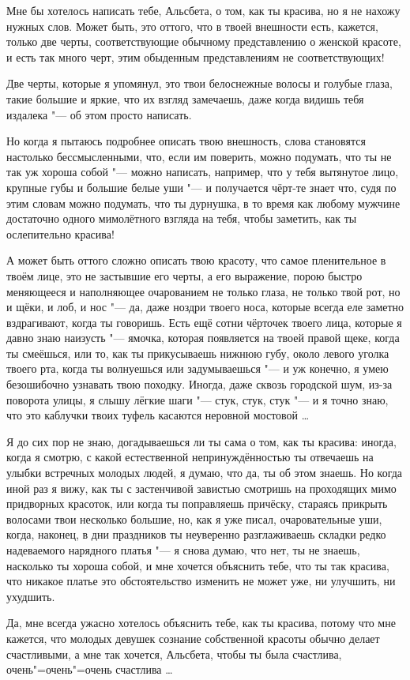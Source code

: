 Мне бы хотелось написать тебе, Альсбета, о том, как ты красива, но я не нахожу
нужных слов.
Может быть, это оттого, что в твоей внешности есть, кажется, только две черты,
соответствующие обычному представлению о женской красоте, и есть так много черт,
этим обыденным представлениям не соответствующих!

Две черты, которые я упомянул, это твои белоснежные волосы и голубые глаза,
такие большие и яркие, что их взгляд замечаешь, даже когда видишь тебя издалека
"--- об этом просто написать.

Но когда я пытаюсь подробнее описать твою внешность, слова становятся настолько
бессмысленными, что, если им поверить, можно подумать, что ты не так уж хороша
собой "--- можно написать, например, что у тебя вытянутое лицо, крупные губы и
большие белые уши "--- и получается чёрт-те знает что, судя по этим словам можно
подумать, что ты дурнушка, в то время как любому мужчине достаточно одного
мимолётного взгляда на тебя, чтобы заметить, как ты ослепительно красива!

А может быть оттого сложно описать твою красоту, что самое пленительное в твоём
лице, это не застывшие его черты, а его выражение, порою быстро меняющееся и
наполняющее очарованием не только глаза, не только твой рот, но и щёки, и лоб,
и нос "--- да, даже ноздри твоего носа, которые всегда еле заметно вздрагивают,
когда ты говоришь.
Есть ещё сотни чёрточек твоего лица, которые я давно знаю наизусть "--- ямочка,
которая появляется на твоей правой щеке, когда ты смеёшься, или то, как ты
прикусываешь нижнюю губу, около левого уголка твоего рта, когда ты волнуешься
или задумываешься "--- и уж конечно, я умею безошибочно узнавать твою походку.
Иногда, даже сквозь городской шум, из-за поворота улицы, я слышу лёгкие шаги
"--- стук, стук, стук "--- и я точно знаю, что это каблучки твоих туфель
касаются неровной мостовой \ldots

Я до сих пор не знаю, догадываешься ли ты сама о том, как ты красива: иногда,
когда я смотрю, с какой естественной непринуждённостью ты отвечаешь на улыбки
встречных молодых людей, я думаю, что да, ты об этом знаешь.
Но когда иной раз я вижу, как ты с застенчивой завистью смотришь на проходящих
мимо придворных красоток, или когда ты поправляешь причёску, стараясь прикрыть
волосами твои несколько большие, но, как я уже писал, очаровательные уши, когда,
наконец, в дни праздников ты неуверенно разглаживаешь складки редко надеваемого
нарядного платья "--- я снова думаю, что нет, ты не знаешь, насколько ты хороша
собой, и мне хочется объяснить тебе, что ты так красива, что никакое платье это
обстоятельство изменить не может уже, ни улучшить, ни ухудшить.

Да, мне всегда ужасно хотелось объяснить тебе, как ты красива, потому что мне
кажется, что молодых девушек сознание собственной красоты обычно делает
счастливыми, а мне так хочется, Альсбета, чтобы ты была счастлива,
очень"=очень"=очень счастлива \ldots
